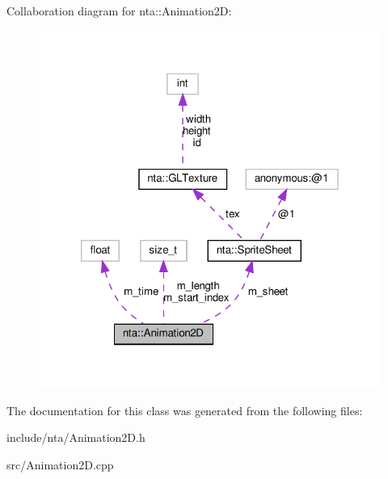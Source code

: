 Collaboration diagram for nta\+:\+:Animation2D\+:
\nopagebreak
\begin{figure}[H]
\begin{center}
\leavevmode
\includegraphics[width=320pt]{db/d21/classnta_1_1Animation2D__coll__graph}
\end{center}
\end{figure}


The documentation for this class was generated from the following files\+:\begin{DoxyCompactItemize}
\item 
include/nta/Animation2\+D.\+h\item 
src/Animation2\+D.\+cpp\end{DoxyCompactItemize}
